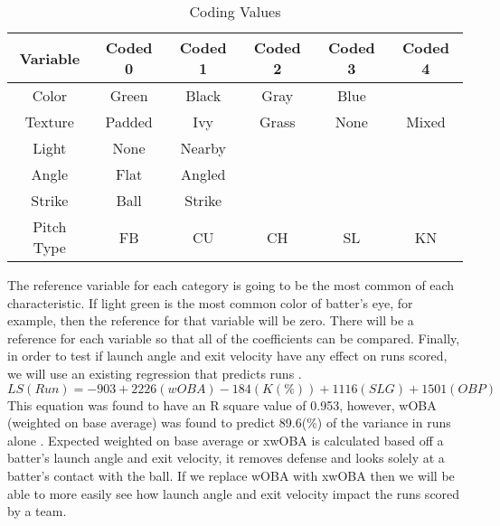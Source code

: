 \documentclass{article}
\begin{document}
\begin{doublespace}
\begin{table}[ht]
\caption{Coding Values}
\centering
\begin{tabular}{c c c c c c}
\hline\hline
Variable & Coded 0 & Coded 1 & Coded 2 & Coded 3 & Coded 4 \\ [0.5ex]
\hline
Color & Green & Black & Gray & Blue  \\
Texture & Padded & Ivy & Grass & None & Mixed \\
Light & None & Nearby \\
Angle & Flat & Angled \\
Strike & Ball & Strike \\
Pitch Type & FB & CU & CH & SL & KN \\
\hline
\end{tabular}
\label{table:Optimal}
\end{table}

The reference variable for each category is going to be the most common of each characteristic. If light green is the most common color of batter’s eye, for example, then the reference for that variable will be zero. There will be a reference for each variable so that all of the coefficients can be compared. 
	Finally, in order to test if launch angle and exit velocity have any effect on runs scored, we will use an existing regression that predicts runs \citep{Beneventano}. 
$$LS(Run)= -903 +2226(wOBA)-184(K(\%)) +1116(SLG) +1501(OBP)$$
	This equation was found to have an R square value of 0.953, however, wOBA (weighted on base average) was found to predict 89.6(\%) of the variance in runs alone \citep{Beneventano}. Expected weighted on base average or xwOBA is calculated based off a batter’s launch angle and exit velocity, it removes defense and looks solely at a batter’s contact with the ball. If we replace wOBA with xwOBA then we will be able to more easily see how launch angle and exit velocity impact the runs scored by a team. 

\end{doublespace}
\pagebreak



\end{document}
